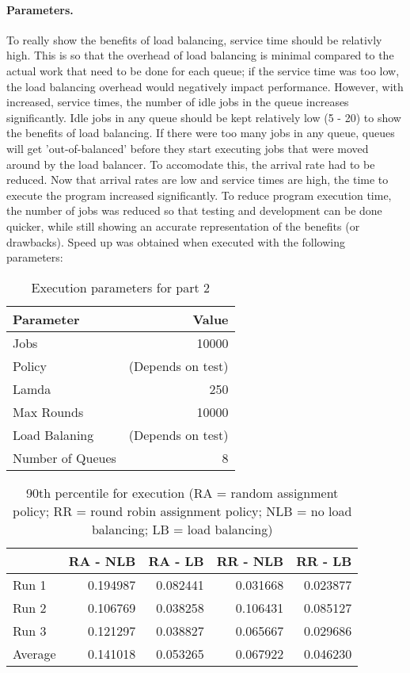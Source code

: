 \documentclass[12pt]{article}
\begin{document}
\paragraph{Parameters.} To really show the benefits of load balancing, service time should be relativly high. This is so that the overhead of load balancing is minimal compared to the actual work that need to be done for each queue; if the service time was too low, the load balancing overhead would negatively impact performance. However, with increased, service times, the number of idle jobs in the queue increases significantly. Idle jobs in any queue should be kept relatively low (5 - 20) to show the benefits of load balancing. If there were too many jobs in any queue, queues will get 'out-of-balanced' before they start executing jobs that were moved around by the load balancer. To accomodate this, the arrival rate had to be reduced. Now that arrival rates are low and service times are high, the time to execute the program increased significantly. To reduce program execution time, the number of jobs was reduced so that testing and development can be done quicker, while still showing an accurate representation of the benefits (or drawbacks). Speed up was obtained when executed with the following parameters:
\begin{table}[H]
  \centering
  \begin{tabular}{lr}
    {\bf Parameter} & {\bf Value} \\
    \hline
    Jobs & 10000 \\
    Policy & (Depends on test) \\
    Lamda & 250 \\
    Max Rounds & 10000 \\
    Load Balaning & (Depends on test) \\
    Number of Queues & 8 \\
  \end{tabular}
  \caption{Execution parameters for part 2}
  \label{tbl-part2-params}
\end{table}

\begin{table}[H]
  \centering
  \begin{tabular}{lrrrr}
    & {\bf RA - NLB} & {\bf RA - LB} & {\bf RR - NLB} & {\bf RR - LB} \\
    \hline
    Run 1 & 0.194987 & 0.082441 & 0.031668 & 0.023877 \\
    Run 2 & 0.106769 & 0.038258 & 0.106431 & 0.085127 \\
    Run 3 & 0.121297 & 0.038827 & 0.065667 & 0.029686 \\
    \hline
    Average & 0.141018 & 0.053265 & 0.067922 & 0.046230 \\
  \end{tabular}
  \caption{90th percentile for execution (RA = random assignment policy; RR = round robin assignment policy; NLB = no load balancing; LB = load balancing)}
  \label{tbl-part2-90th-percentile}
\end{table}
\end{document}
